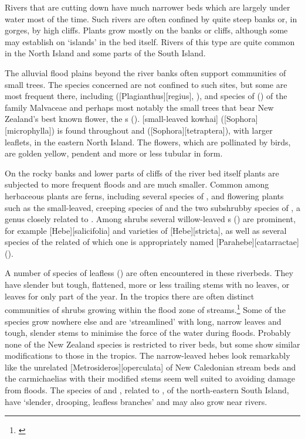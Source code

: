 Rivers that are cutting down have much narrower beds which are largely under water most of the time.
Such rivers are often confined by quite steep banks or, in gorges, by high cliffs.
Plants grow mostly on the banks or cliffs, although some may establish on `islands' in the bed itself.
Rivers of this type are quite common in the North Island and some parts of the South Island.

The alluvial flood plains beyond the river banks often support communities of small trees.
The species concerned are not confined to such sites, but some are most frequent there, including  ([Plagianthus][regius], ), and species of  () of the family Malvaceae and perhaps most notably the small trees that bear New Zealand's best known flower, the s ().
[small-leaved kowhai] ([Sophora][microphylla]) is found throughout and  ([Sophora][tetraptera]), with larger leaflets, in the eastern North Island.
The flowers, which are pollinated by birds, are golden yellow, pendent and more or less tubular in form.

On the rocky banks and lower parts of cliffs of the river bed itself plants are subjected to more frequent floods and are much smaller.
Common among herbaceous plants are ferns, including several species of , and flowering plants such as the small-leaved, creeping species of  and the two subshrubby species of , a genus closely related to .
Among shrubs several willow-leaved s () are prominent, for example [Hebe][salicifolia] and varieties of [Hebe][stricta], as well as several species of the related  of which one is appropriately named [Parahebe][catarractae] ().

A number of species of leafless  () are often encountered in these riverbeds.
They have slender but tough, flattened, more or less trailing stems with no leaves, or leaves for only part of the year.
In the tropics there are often distinct communities of shrubs growing within the flood zone of streams.\footnote{\cite{ansteenis1981rheophytes}}
Some of the species grow nowhere else and are `streamlined' with long, narrow leaves and tough, slender stems to minimise the force of the water during floods.
Probably none of the New Zealand species is restricted to river beds, but some show similar modifications to those in the tropics.
The narrow-leaved hebes look remarkably like the unrelated [Metrosideros][operculata] of New Caledonian stream beds and the carmichaelias with their modified stems seem well suited to avoiding damage from floods.
The species of  and , related to , of the north-eastern South Island, have `slender, drooping, leafless branches' and may also grow near rivers.

